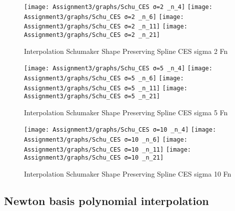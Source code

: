 \documentclass[]{article}
\begin{document}
\begin{figure}

{\centering \texttt{[image: Assignment3/graphs/Schu\_CES σ=2 \_n\_4]} \texttt{[image: Assignment3/graphs/Schu\_CES σ=2 \_n\_6]} \texttt{[image: Assignment3/graphs/Schu\_CES σ=2 \_n\_11]} \texttt{[image: Assignment3/graphs/Schu\_CES σ=2 \_n\_21]} 

}

\caption{Interpolation Schumaker Shape Preserving Spline CES sigma 2 Fn}\label{fig:unnamed-chunk-4}
\end{figure}

\begin{figure}

{\centering \texttt{[image: Assignment3/graphs/Schu\_CES σ=5 \_n\_4]} \texttt{[image: Assignment3/graphs/Schu\_CES σ=5 \_n\_6]} \texttt{[image: Assignment3/graphs/Schu\_CES σ=5 \_n\_11]} \texttt{[image: Assignment3/graphs/Schu\_CES σ=5 \_n\_21]} 

}

\caption{Interpolation Schumaker Shape Preserving Spline CES sigma 5 Fn}\label{fig:unnamed-chunk-5}
\end{figure}

\begin{figure}

{\centering \texttt{[image: Assignment3/graphs/Schu\_CES σ=10 \_n\_4]} \texttt{[image: Assignment3/graphs/Schu\_CES σ=10 \_n\_6]} \texttt{[image: Assignment3/graphs/Schu\_CES σ=10 \_n\_11]} \texttt{[image: Assignment3/graphs/Schu\_CES σ=10 \_n\_21]} 

}

\caption{Interpolation Schumaker Shape Preserving Spline CES sigma 10 Fn}\label{fig:unnamed-chunk-6}
\end{figure}

\newpage

\hypertarget{newton-basis-polynomial-interpolation}{%
\subsection{Newton basis polynomial
interpolation}\label{newton-basis-polynomial-interpolation}}
\end{document}
